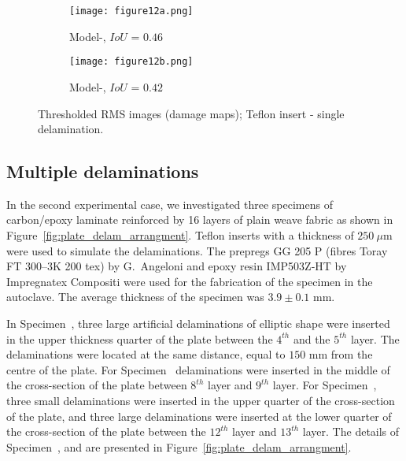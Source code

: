 \begin{figure} [!h]
	\begin{subfigure}[b]{0.49\textwidth}
		\centering
		\texttt{[image: figure12a.png]}
		\caption{\centering Model-, \(IoU\) = \(0.46\)}
		\label{fig:RMS_threshold_CFRP_Teflon_3o_saeed}
	\end{subfigure}
	\hfill
	\begin{subfigure}[b]{0.49\textwidth}
		\centering
		\texttt{[image: figure12b.png]}
		\caption{\centering Model-, \(IoU\) = \(0.42\)} 
		\label{fig:RMS_threshold_CFRP_Teflon_3o_ijjeh}
	\end{subfigure}
	\caption{Thresholded RMS images (damage maps); Teflon insert - single delamination.}
	\label{fig:RMS_threshold_CFRP_Teflon_3o_images}
\end{figure} 
\clearpage
\subsection{Multiple delaminations}
In the second experimental case, we investigated three specimens of 
carbon/epoxy laminate reinforced by 16 layers of plain weave fabric as shown in 
Figure~\ref{fig:plate_delam_arrangment}. 
Teflon inserts with a thickness of \(250\ \mu\)m were used to simulate the delaminations.
The prepregs GG 205 P (fibres Toray FT 300–3K 200 tex) by G.~Angeloni and epoxy resin IMP503Z‐HT by Impregnatex Compositi were used for the fabrication of the specimen in the autoclave. 
The average thickness of the specimen was \(3.9 \pm 0.1\) mm.

In Specimen~, three large artificial delaminations of elliptic shape were inserted in the upper thickness quarter of the plate between the \(4^{th}\) and the \(5^{th}\) layer.
The delaminations were located at the same distance, equal to \(150\) mm from the centre of the plate.
For Specimen~ delaminations were inserted in the middle of the cross-section of the plate between \(8^{th}\) layer and \(9^{th}\) layer.
For Specimen~, three small delaminations were inserted in the upper quarter of the cross-section of the plate, and three large delaminations were inserted at the lower quarter of the cross-section of the plate between the \(12^{th}\) layer and \(13^{th}\) layer.
The details of Specimen~,  and  are presented in 
Figure~\ref{fig:plate_delam_arrangment}.

